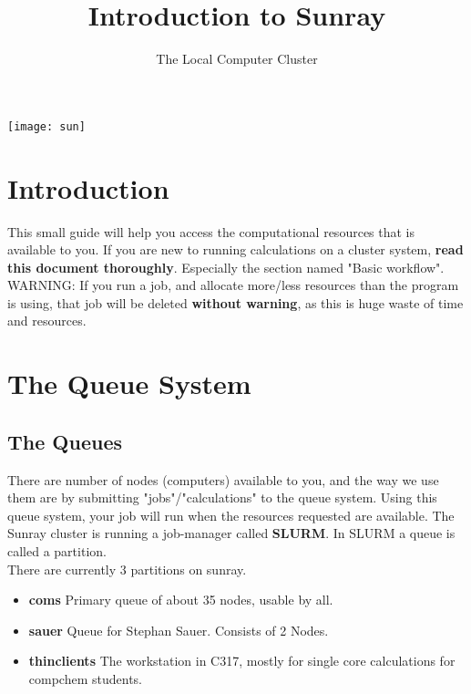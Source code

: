 \documentclass{article}
\title{Introduction to Sunray}
\author{The Local Computer Cluster}
\date{}
\begin{document}

\maketitle

\begin{center}
    \texttt{[image: sun]}
\end{center}

\tableofcontents


\newpage


\section{Introduction}

This small guide will help you access the computational resources that is available to you.
If you are new to running calculations on a cluster system, {\bf read this document thoroughly}. Especially the section named "Basic workflow".\\

WARNING: If you run a job, and allocate more/less resources than the program is using, that job will be deleted {\bf without warning}, as this is huge waste of time and resources.\\


\newpage
\section{The Queue System}

\subsection*{The Queues}

There are number of nodes (computers) available to you, and the way we use them are by submitting "jobs"/"calculations" to the queue system.
%
Using this queue system, your job will run when the resources requested are available.
The Sunray cluster is running a job-manager called {\bf SLURM}.
In SLURM a queue is called a partition.\\

There are currently 3 partitions on sunray.

\begin{itemize}
    \item {\bf coms} Primary queue of about 35 nodes, usable by all. \newline

    \item {\bf sauer} Queue for Stephan Sauer. Consists of 2 Nodes. \newline

    \item {\bf thinclients} The workstation in C317, mostly for single core calculations for compchem students.

\end{itemize}
\end{document}
